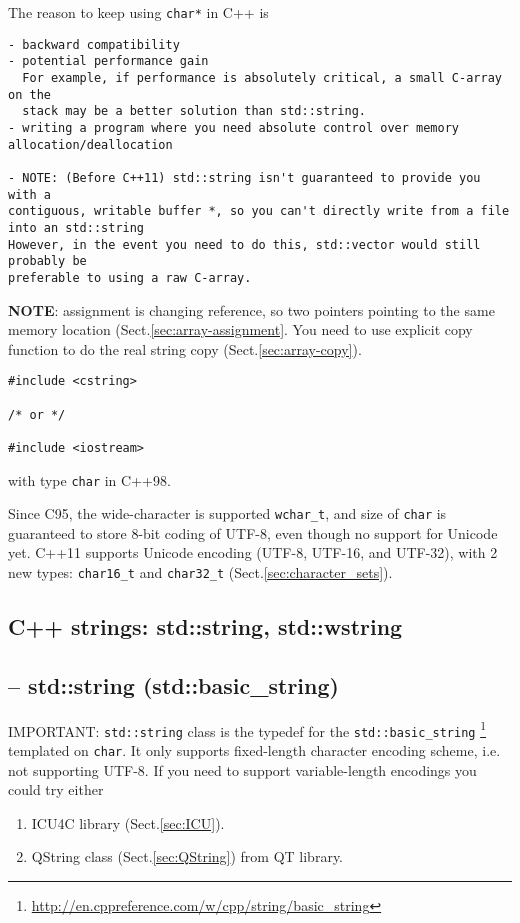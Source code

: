 The reason to keep using \verb!char*! in C++ is 
\begin{verbatim}
- backward compatibility
- potential performance gain 
  For example, if performance is absolutely critical, a small C-array on the
  stack may be a better solution than std::string. 
- writing a program where you need absolute control over memory
allocation/deallocation

- NOTE: (Before C++11) std::string isn't guaranteed to provide you with a
contiguous, writable buffer *, so you can't directly write from a file into an std::string
However, in the event you need to do this, std::vector would still probably be
preferable to using a raw C-array.
\end{verbatim}

{\bf NOTE}: assignment is changing reference, so two pointers pointing to the
same memory location (Sect.\ref{sec:array-assignment}. You need to use
explicit copy function to do the real string copy (Sect.\ref{sec:array-copy}).

\begin{verbatim}
#include <cstring> 

/* or */

#include <iostream>
\end{verbatim}
with type \verb!char! in C++98. 

Since C95, the wide-character is supported \verb!wchar_t!, and size of
\verb!char! is guaranteed to store 8-bit coding of UTF-8, even though no support
for Unicode yet. C++11 supports Unicode encoding (UTF-8, UTF-16, and UTF-32),
with 2 new types: \verb!char16_t! and \verb!char32_t!
(Sect.\ref{sec:character_sets}).


\subsection{C++ strings: std::string, std::wstring}
\label{sec:C++_string}

\subsection{-- std::string (std::basic\_string)}
\label{sec:std::string}
\label{sec:std::basic_string}

IMPORTANT: \verb!std::string! class is the typedef for the
\verb!std::basic_string!
\footnote{\url{http://en.cppreference.com/w/cpp/string/basic_string}} templated
on \verb!char!. It only supports fixed-length character encoding scheme, i.e.
not supporting UTF-8. If you need to support variable-length encodings you could
try either 
\begin{enumerate}
  \item  ICU4C library (Sect.\ref{sec:ICU}).
  \item QString class (Sect.\ref{sec:QString}) from QT library.
\end{enumerate}

